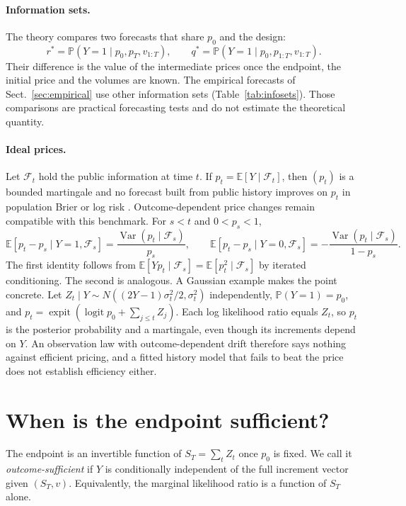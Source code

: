 \documentclass[runningheads]{llncs}
\newcommand{\E}{\mathbb E}
\newcommand{\Prob}{\mathbb P}
\newcommand{\logit}{\operatorname{logit}}
\newcommand{\sigmoid}{\operatorname{expit}}
\begin{document}
\paragraph{Information sets.}
The theory compares two forecasts that share $p_0$ and the design:
\[
 r^*=\Prob(Y=1\mid p_0,p_T,v_{1:T}),\qquad q^*=\Prob(Y=1\mid p_0,p_{1:T},v_{1:T}).
\]
Their difference is the value of the intermediate prices once the endpoint, the initial price and the volumes are known. The empirical forecasts of Sect.~\ref{sec:empirical} use other information sets (Table~\ref{tab:infosets}). Those comparisons are practical forecasting tests and do not estimate the theoretical quantity.

\paragraph{Ideal prices.}
Let $\mathcal F_t$ hold the public information at time $t$. If $p_t=\E[Y\mid\mathcal F_t]$, then $(p_t)$ is a bounded martingale and no forecast built from public history improves on $p_t$ in population Brier or log risk \cite{gelman2020information}. Outcome-dependent price changes remain compatible with this benchmark. For $s<t$ and $0<p_s<1$,
\begin{equation}
 \E[p_t-p_s\mid Y=1,\mathcal F_s]=\frac{\operatorname{Var}(p_t\mid\mathcal F_s)}{p_s},\qquad
 \E[p_t-p_s\mid Y=0,\mathcal F_s]=-\frac{\operatorname{Var}(p_t\mid\mathcal F_s)}{1-p_s}.
 \label{eq:outcome-drift}
\end{equation}
The first identity follows from $\E[Yp_t\mid\mathcal F_s]=\E[p_t^2\mid\mathcal F_s]$ by iterated conditioning. The second is analogous. A Gaussian example makes the point concrete. Let $Z_t\mid Y\sim N((2Y-1)\sigma_t^2/2,\sigma_t^2)$ independently, $\Prob(Y=1)=p_0$, and $p_t=\sigmoid(\logit p_0+\sum_{j\leq t}Z_j)$. Each log likelihood ratio equals $Z_t$, so $p_t$ is the posterior probability and a martingale, even though its increments depend on $Y$. An observation law with outcome-dependent drift therefore says nothing against efficient pricing, and a fitted history model that fails to beat the price does not establish efficiency either.

\section{When is the endpoint sufficient?}
\label{sec:endpoint}
The endpoint is an invertible function of $S_T=\sum_tZ_t$ once $p_0$ is fixed. We call it \emph{outcome-sufficient} if $Y$ is conditionally independent of the full increment vector given $(S_T,v)$. Equivalently, the marginal likelihood ratio is a function of $S_T$ alone.
\end{document}
